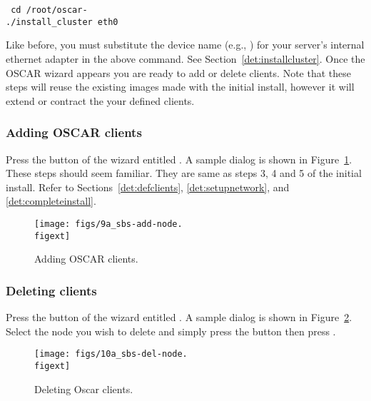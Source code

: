 \vspace{11pt}
{\tt
  cd /root/oscar-\oscarversion\ \\
\indent  ./install\_cluster eth0
}
\vspace{11pt}
  
Like before, you must substitute the device name (e.g., ) for your server's internal ethernet adapter in the above command. See Section~\ref{det:installcluster}. Once the OSCAR wizard appears you are ready to add or delete clients. Note that these steps will reuse the existing images made with the initial install, however it will extend or contract the your defined clients.

\subsubsection{Adding OSCAR clients}
Press the button of the wizard entitled . A sample dialog is shown in Figure~\ref{fig:detailed-add-node}. These steps should seem familiar. They are same as steps 3, 4 and 5 of the initial install. Refer to Sections~\ref{det:defclients}, \ref{det:setupnetwork}, and \ref{det:completeinstall}.

\begin{figure}[htbp]
  \begin{center}
    \texttt{[image: figs/9a\_sbs-add-node.\\figext]}
    \caption{Adding OSCAR clients.}
    \label{fig:detailed-add-node}
  \end{center}
\end{figure}

\subsubsection{Deleting clients}

Press the button of the wizard entitled . A sample dialog is shown in Figure~\ref{fig:detailed-delete-node}. Select the node you wish to delete and simply press the button  then press .

\begin{figure}[htbp]
  \begin{center}
    \texttt{[image: figs/10a\_sbs-del-node.\\figext]}
    \caption{Deleting Oscar clients.}
    \label{fig:detailed-delete-node}
  \end{center}
\end{figure}

\endchange
